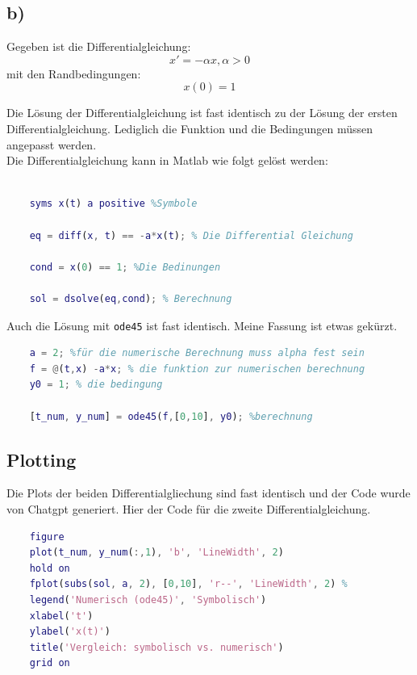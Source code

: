 \documentclass{scrartcl}
\begin{document}
\subsection*{b)}
Gegeben ist die Differentialgleichung:
\begin{equation*}
    x'=-\alpha x,  \alpha>0
\end{equation*}
mit den Randbedingungen:
\begin{equation*}
    x(0)=1
\end{equation*}

Die Lösung der Differentialgleichung ist fast identisch zu der Lösung der ersten Differentialgleichung. Lediglich die Funktion und die Bedingungen müssen angepasst werden.\\
Die Differentialgleichung kann in Matlab wie folgt gelöst werden:
\begin{lstlisting}[language=Matlab, caption=Symbolic Math]
    % Symbolic Math:

    syms x(t) a positive %Symbole
    
    eq = diff(x, t) == -a*x(t); % Die Differential Gleichung
    
    cond = x(0) == 1; %Die Bedinungen
    
    sol = dsolve(eq,cond); % Berechnung
\end{lstlisting}

Auch die Lösung mit \texttt{ode45} ist fast identisch. Meine Fassung ist etwas gekürzt.\\
\begin{lstlisting}[language=Matlab, caption=Numeric Math]
    %Numeric Math:
    a = 2; %für die numerische Berechnung muss alpha fest sein
    f = @(t,x) -a*x; % die funktion zur numerischen berechnung
    y0 = 1; % die bedingung

    [t_num, y_num] = ode45(f,[0,10], y0); %berechnung
\end{lstlisting}

\subsection*{Plotting}
Die Plots der beiden Differentialgliechung sind fast identisch und der Code wurde von Chatgpt generiert. Hier der Code für die zweite Differentialgleichung.\\
\begin{lstlisting}[language=Matlab, caption=Plot]
    %Plot von Chat GPT erstellt
    figure
    plot(t_num, y_num(:,1), 'b', 'LineWidth', 2)
    hold on
    fplot(subs(sol, a, 2), [0,10], 'r--', 'LineWidth', 2) %
    legend('Numerisch (ode45)', 'Symbolisch')
    xlabel('t')
    ylabel('x(t)')
    title('Vergleich: symbolisch vs. numerisch')
    grid on
\end{lstlisting}
\end{document}

